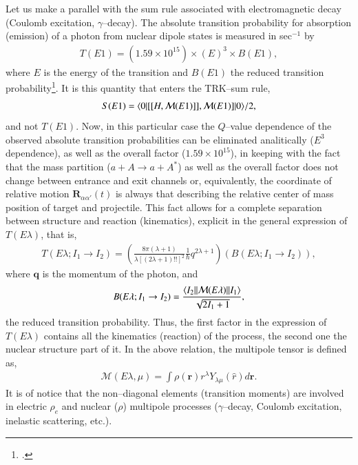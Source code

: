 Let us make a parallel with the sum rule associated with electromagnetic decay (Coulomb excitation, $\gamma$--decay). The absolute transition probability for absorption (emission) of a photon from nuclear dipole states is measured in sec$^{-1}$ by
\begin{align}
T(E1)=\left(1.59\times 10^{15}\right)\times (E)^3\times B(E1),
\end{align}
where $E$ is the energy of the transition and $B(E1)$ the reduced transition probability\footnote{\cite{Bohr:69}.}. It is this quantity that enters the TRK--sum rule,
\begin{align}
S(E1)=\langle {0}|[[H,\mathcal M(E1)]],\mathcal M(E1)]|{0} \rangle/2,
\end{align}
 and not $T(E1)$. Now, in this particular case the $Q$--value dependence of the observed absolute transition probabilities can be eliminated analitically ($E^3$ dependence), as well as the overall factor  ($1.59\times 10^{15}$), in keeping with the fact that the mass partition ($a+A\rightarrow a+A^*$) as well as the overall factor does not change between entrance and exit channels or, equivalently, the coordinate of relative motion $\mathbf R_{\alpha\alpha'}(t)$ is always that describing the relative center of mass position of target and projectile. This fact allows for a complete separation between structure and reaction (kinematics), explicit in the general expression of $T(E\lambda)$, that is,
 \begin{align}
 T(E\lambda;I_1\rightarrow I_2)=\left(\frac{8\pi(\lambda+1)}{\lambda[(2\lambda+1)!!]^2}\frac{1}{\hbar}q^{2\lambda+1}\right)\left(B(E\lambda;I_1\rightarrow I_2)\right),
 \end{align}
where $\mathbf q$ is the momentum of the photon, and 
 \begin{align}
B(E\lambda;I_1\rightarrow I_2)=\frac{\langle {I_2||\mathcal M(E\lambda)||I_1} \rangle}{\sqrt{2I_1+1}},
 \end{align}
 the reduced transition probability. Thus, the first factor in the expression of $T(E\lambda)$ contains all the kinematics (reaction) of the process, the second  one the nuclear structure part of it. In the above relation, the multipole tensor is defined as,
 \begin{align}
\mathcal M(E\lambda,\mu)=\int \rho(\mathbf r)r^\lambda Y_{\lambda\mu}(\hat r)d \mathbf r.
 \end{align}
It is of notice that the non--diagonal elements (transition moments) are involved in electric $\rho_e$ and nuclear ($\rho$) multipole processes ($\gamma$--decay, Coulomb excitation, inelastic scattering, etc.).



